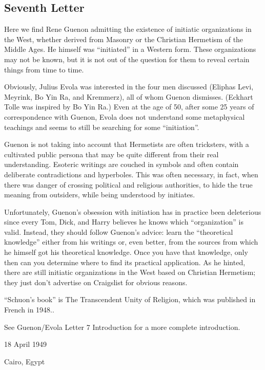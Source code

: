 \subsection{Seventh Letter}

\begin{quotex}
Here we find Rene Guenon admitting the existence of initiatic organizations in the West, whether derived from Masonry or the Christian Hermetism of the Middle Ages. He himself was “initiated” in a Western form. These organizations may not be known, but it is not out of the question for them to reveal certain things from time to time.

Obviously, Julius Evola was interested in the four men discussed (Eliphas Levi, Meyrink, Bo Yin Ra, and Kremmerz), all of whom Guenon dismisses. (Eckhart Tolle was inspired by Bo Yin Ra.) Even at the age of 50, after some 25 years of correspondence with Guenon, Evola does not understand some metaphysical teachings and seems to still be searching for some “initiation”.

Guenon is not taking into account that Hermetists are often tricksters, with a cultivated public persona that may be quite different from their real understanding. Esoteric writings are couched in symbols and often contain deliberate contradictions and hyperboles. This was often necessary, in fact, when there was danger of crossing political and religious authorities, to hide the true meaning from outsiders, while being understood by initiates.

Unfortunately, Guenon's obsession with initiation has in practice been deleterious since every Tom, Dick, and Harry believes he knows which “organization” is valid. Instead, they should follow Guenon's advice: learn the “theoretical knowledge” either from his writings or, even better, from the sources from which he himself got his theoretical knowledge. Once you have that knowledge, only then can you determine where to find its practical application. As he hinted, there are still initiatic organizations in the West based on Christian Hermetism; they just don't advertise on Craigslist for obvious reasons.

“Schuon's book” is The Transcendent Unity of Religion, which was published in French in 1948..

See Guenon/Evola Letter 7 Introduction for a more complete introduction. 

\end{quotex}
18 April 1949


Cairo, Egypt

